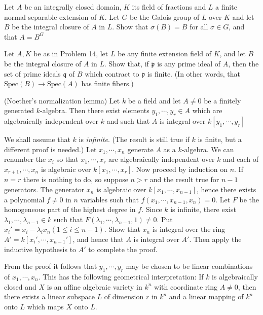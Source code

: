 \documentclass{solution}
\begin{document}

\begin{problem}
    Let $A$ be an integrally closed domain, $K$ its field of fractions and $L$ a finite normal separable extension of $K$. Let $G$ be the Galois group of $L$ over $K$ and let $B$ be the integral closure of $A$ in $L$. Show that $\sigma(B) = B$ for all $\sigma \in G$, and that $A = B^G$
\end{problem}

\begin{problem}
    Let $A, K$ be as in Problem 14, let $L$ be any finite extension field of $K$, and let $B$ be the integral closure of $A$ in $L$. Show that, if $\mathfrak{p}$ is any prime ideal of $A$, then the set of prime ideals $\mathfrak{q}$ of $B$ which contract to $\mathfrak{p}$ is finite. (In other words, that $\mathrm{Spec}(B) \rightarrow \mathrm{Spec}(A)$ has finite fibers.)
\end{problem}

\begin{problem}
    (Noether's normalization lemma) Let $k$ be a field and let $A \ne 0$ be a finitely generated $k$-algebra. Then there exist elements $y_1, \cdots, y_r \in A$ which are algebraically independent over $k$ and such that $A$ is integral over $k[y_1, \cdots, y_r]$

    We shall assume that $k$ is \textit{infinite}. (The result is still true if $k$ is finite, but a different proof is needed.) Let $x_1, \cdots, x_n$ generate $A$ as a $k$-algebra. We can renumber the $x_i$ so that $x_1, \cdots, x_r$ are algebraically independent over $k$ and each of $x_{r + 1}, \cdots, x_n$ is algebraic over $k[x_1, \cdots, x_r]$. Now proceed by induction on $n$. If $n = r$ there is nothing to do, so suppose $n \gt r$ and the result true for $n - 1$ generators. The generator $x_n$ is algebraic over $k[x_1, \cdots, x_{n - 1}]$, hence there exists a polynomial $f \ne 0$ in $n$ variables such that $f(x_1, \cdots, x_{n - 1}, x_n) = 0$. Let $F$ be the homogeneous part of the highest degree in $f$. Since $k$ is infinite, there exist $\lambda_1, \cdots, \lambda_{n - 1} \in k$ such that $F(\lambda_1, \cdots, \lambda_{n - 1}, 1) \ne 0$. Put $x_i' = x_i - \lambda_i x_n (1 \le i \le n - 1)$. Show that $x_n$ is integral over the ring $A' = k[x_i', \cdots, x_{n - 1}']$, and hence that $A$ is integral over $A'$. Then apply the inductive hypothesis to $A'$ to complete the proof.

    From the proof it follows that $y_1, \cdots, y_r$ may be chosen to be linear combinations of $x_1, \cdots, x_n$. This has the following geometrical interpretation: If $k$ is algebraically closed and $X$ is an affine algebraic variety in $k^n$ with coordinate ring $A \ne 0$, then there exists a linear subspace $L$ of dimension $r$ in $k^n$ and a linear mapping of $k^n$ onto $L$ which maps $X$ onto $L$.
\end{problem}
\end{document}
